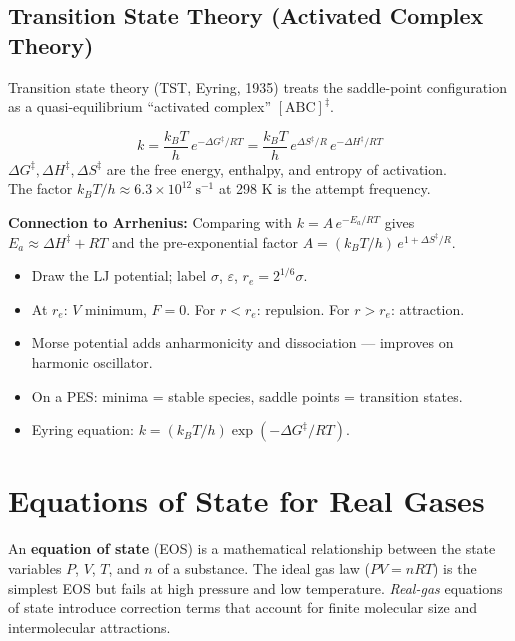 \documentclass[12pt,a4paper]{article}
\begin{document}
\subsection{Transition State Theory (Activated Complex Theory)}
Transition state theory (TST, Eyring, 1935) treats the saddle-point configuration as a quasi-equilibrium ``activated complex'' $[\mathrm{ABC}]^\ddagger$.

\begin{tcolorbox}[formulabox, title={Eyring Rate Equation}]
\[
k = \frac{k_B T}{h}\,e^{-\Delta G^\ddagger/RT} = \frac{k_B T}{h}\,e^{\Delta S^\ddagger/R}\,e^{-\Delta H^\ddagger/RT}
\]
$\Delta G^\ddagger, \Delta H^\ddagger, \Delta S^\ddagger$ are the free energy, enthalpy, and entropy of activation.\\
The factor $k_B T/h \approx 6.3\times10^{12}\ \mathrm{s^{-1}}$ at 298 K is the attempt frequency.
\end{tcolorbox}

\textbf{Connection to Arrhenius:} Comparing with $k=A\,e^{-E_a/RT}$ gives $E_a \approx \Delta H^\ddagger + RT$ and the pre-exponential factor $A = (k_BT/h)\,e^{1+\Delta S^\ddagger/R}$.

\begin{tcolorbox}[exambox, title={Exam Points (Section 2)}]
\begin{itemize}[leftmargin=*, itemsep=2pt, topsep=2pt]
  \item Draw the LJ potential; label $\sigma$, $\varepsilon$, $r_e = 2^{1/6}\sigma$.
  \item At $r_e$: $V$ minimum, $F=0$. For $r<r_e$: repulsion. For $r>r_e$: attraction.
  \item Morse potential adds anharmonicity and dissociation — improves on harmonic oscillator.
  \item On a PES: minima = stable species, saddle points = transition states.
  \item Eyring equation: $k = (k_BT/h)\exp(-\Delta G^\ddagger/RT)$.
\end{itemize}
\end{tcolorbox}

\section{Equations of State for Real Gases}

\begin{tcolorbox}[defbox]
An \textbf{equation of state} (EOS) is a mathematical relationship between the state variables $P$, $V$, $T$, and $n$ of a substance. The ideal gas law ($PV = nRT$) is the simplest EOS but fails at high pressure and low temperature. \emph{Real-gas} equations of state introduce correction terms that account for finite molecular size and intermolecular attractions.
\end{tcolorbox}
\end{document}
